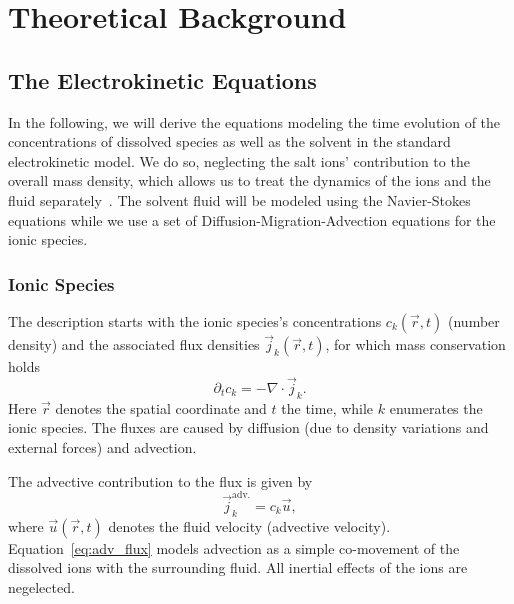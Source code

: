 \section{Theoretical Background}

\subsection{The Electrokinetic Equations}

In the following, we will derive the equations modeling the time evolution of the concentrations of dissolved species as well as the solvent in the standard electrokinetic model. We do so, neglecting the salt ions' contribution to the overall mass density, which allows us to treat the dynamics of the ions and the fluid separately~\cite{degraaf14a}. The solvent fluid will be modeled using the Navier-Stokes equations while we use a set of Diffusion-Migration-Advection equations for the ionic species.

\subsubsection{\label{sub:species}Ionic Species}

The description starts with the ionic species's concentrations $c_{k}(\vec{r}, t)$ (number density) and the associated flux densities $\vec{j}_{k}(\vec{r}, t)$, for which mass conservation holds
%
\begin{equation}
\label{eq:model_continuity}
\partial_{t} c_{k} = -\nabla \cdot\vec{j}_{k} . 
\end{equation}
%
Here $\vec{r}$ denotes the spatial coordinate and $t$ the time, while $k$ enumerates the ionic species. The fluxes are caused by diffusion (due to density variations and external forces) and advection.

The advective contribution to the flux is given by
%
\begin{equation}
\label{eq:adv_flux}
\vec{j}_{k}^{\mathrm{adv.}} = c_{k} \vec{u} ,
\end{equation}
%
where $\vec{u}(\vec{r}, t)$ denotes the fluid velocity (advective velocity). Equation~\eqref{eq:adv_flux} models advection as a simple co-movement of the dissolved ions with the surrounding fluid. All inertial effects of the ions are negelected.

